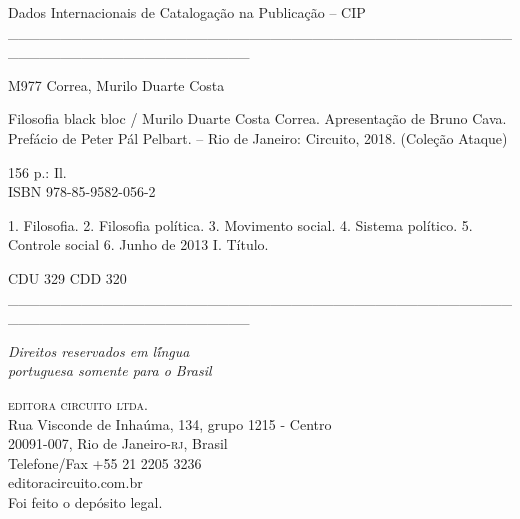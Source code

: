 {%
\begin{flushleft}
\hspace{10pt}Dados Internacionais de Catalogação na Publicação -- CIP
\_\_\_\_\_\_\_\_\_\_\_\_\_\_\_\_\_\_\_\_\_\_\_\_\_\_\_\_\_\_\_\_\_\_\_\_\_\_\_\_\_\_\_\_\_\_\_\_\_\_\_\_\_\_\_\_\_\_\_\_\_\_\_\_\_\_\_\_\_\_\_
\end{flushleft}
M977 \hspace{9pt}Correa, Murilo Duarte Costa\\
\hspace{20pt}\parbox{185pt}{Filosofia black bloc / Murilo Duarte Costa Correa. Apresentação de Bruno Cava. Prefácio de Peter Pál Pelbart. -- Rio de Janeiro: Circuito, 2018. (Coleção Ataque)}

\hspace{20pt}156 p.: Il.\\[6pt]

\hspace{20pt}ISBN 978-85-9582-056-2\\[6pt]

\hspace{20pt}\parbox{185pt}{1. Filosofia. 2. Filosofia política. 3. Movimento social. 4. Sistema político. 5. Controle social 6. Junho de 2013 I. Título.}

\begin{flushleft}
\hspace{20pt}CDU 329 \hspace{138pt}CDD 320
\_\_\_\_\_\_\_\_\_\_\_\_\_\_\_\_\_\_\_\_\_\_\_\_\_\_\_\_\_\_\_\_\_\_\_\_\_\_\_\_\_\_\_\_\_\_\_\_\_\_\_\_\_\_\_\_\_\_\_\_\_\_\_\_\_\_\_\_\_\_\_\\
\end{flushleft}

\vfill\textit{Direitos reservados em l\'íngua\\ portuguesa somente para o Brasil}\\\medskip

%
\textsc{editora circuito ltda.}\\ 
Rua Visconde de Inhaúma, 134, grupo 1215 - Centro\\
20091-007, Rio de Janeiro-\textsc{rj}, Brasil\\
Telefone/Fax +55 21 2205 3236\\\smallskip
editoracircuito.com.br\\
\bigskip
Foi feito o depósito legal.\\\endgroup
\pagebreak\raggedleft
\titulagem

}
